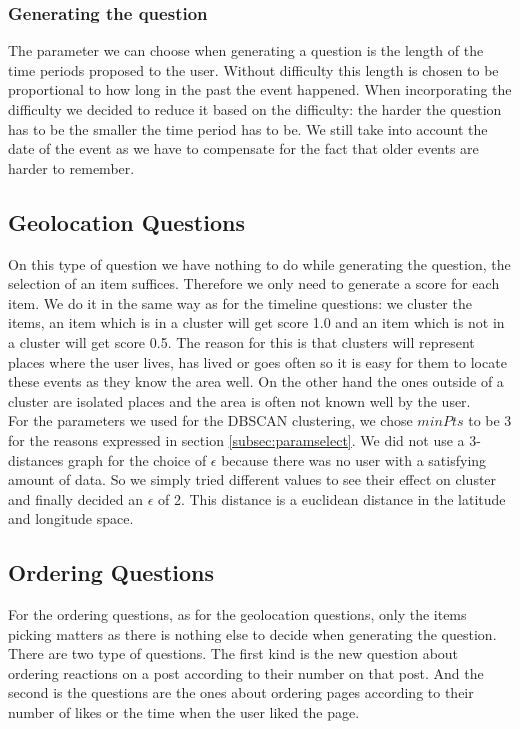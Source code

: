 \subsubsection{Generating the question}
The parameter we can choose when generating a question is the length of the time periods proposed to the user. Without difficulty this length is chosen to be proportional to how long in the past the event happened. When incorporating the difficulty we decided to reduce it based on the difficulty: the harder the question has to be the smaller the time period has to be. We still take into account the date of the event as we have to compensate for the fact that older events are harder to remember.

\subsection{Geolocation Questions}
On this type of question we have nothing to do while generating the question, the selection of an item suffices. Therefore we only need to generate a score for each item. We do it in the same way as for the timeline questions: we cluster the items, an item which is in a cluster will get score 1.0 and an item which is not in a cluster will get score 0.5. The reason for this is that clusters will represent places where the user lives, has lived or goes often so it is easy for them to locate these events as they know the area well. On the other hand the ones outside of a cluster are isolated places and the area is often not known well by the user.\\
For the parameters we used for the DBSCAN clustering, we chose $minPts$ to be 3 for the reasons expressed in section \ref{subsec:paramselect}. We did not use a 3-distances graph for the choice of $\epsilon$ because there was no user with a satisfying amount of data. So we simply tried different values to see their effect on cluster and finally decided an $\epsilon$ of 2. This distance is a euclidean distance in the latitude and longitude space.
\subsection{Ordering Questions}
For the ordering questions, as for the geolocation questions, only the items picking matters as there is nothing else to decide when generating the question. There are two type of questions. The first kind is the new question about ordering reactions on a post according to their number on that post. And the second is the questions are the ones about ordering pages according to their number of likes or the time when the user liked the page.
